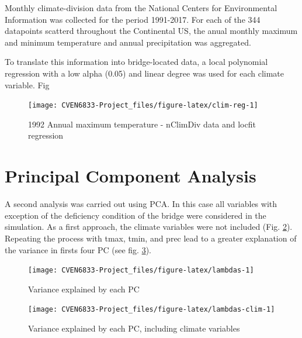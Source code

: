 \documentclass[]{book}
\theoremstyle{definition}
\theoremstyle{definition}
\theoremstyle{definition}
\theoremstyle{remark}
\begin{document}
Monthly climate-division data from the National Centers for
Environmental Information \citep{voseImprovedHistoricalTemperature2014}
was collected for the period 1991-2017. For each of the 344 datapoints
scatterd throughout the Continental US, the anual monthly maximum and
minimum temperature and annual precipitation was aggregated.

To translate this information into bridge-located data, a local
polynomial regression with a low alpha (0.05) and linear degree was used
for each climate variable. Fig

\begin{figure}

{\centering \texttt{[image: CVEN6833-Project\_files/figure-latex/clim-reg-1]} 

}

\caption{1992 Annual maximum temperature - nClimDiv data and locfit regression}\label{fig:clim-reg}
\end{figure}

\section{Principal Component
Analysis}\label{principal-component-analysis}

A second analysis was carried out using PCA. In this case all variables
with exception of the deficiency condition of the bridge were considered
in the simulation. As a first approach, the climate variables were not
included (Fig. \ref{fig:lambdas}). Repeating the process with tmax,
tmin, and prec lead to a greater explanation of the variance in firsts
four PC (see fig. \ref{fig:lambdas-clim}).

\begin{figure}

{\centering \texttt{[image: CVEN6833-Project\_files/figure-latex/lambdas-1]} 

}

\caption{Variance explained by each PC}\label{fig:lambdas}
\end{figure}

\begin{figure}

{\centering \texttt{[image: CVEN6833-Project\_files/figure-latex/lambdas-clim-1]} 

}

\caption{Variance explained by each PC, including climate variables}\label{fig:lambdas-clim}
\end{figure}
\end{document}
